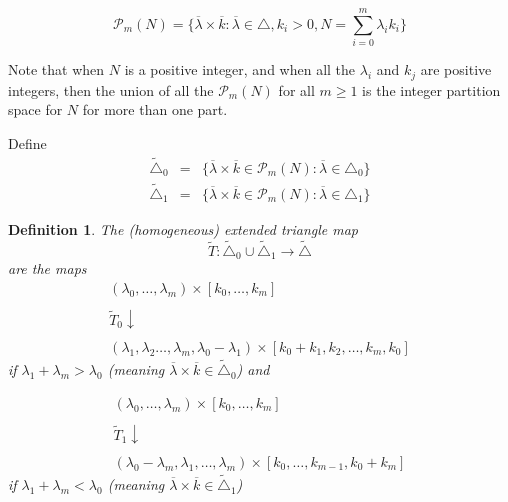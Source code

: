 \documentclass[12pt,oneside,openany]{article}
\newtheorem{definition}[theorem]{Definition}
\begin{document}
$$\mathcal{P}_m(N) = \{\overline{\lambda} \times \overline{k}: \overline{\lambda} \in \triangle, k_i>0, N = \sum_{i=0}^m \lambda_i k_i \} $$

Note that when $N$ is a positive integer, and when all the $\lambda_i$ and $k_j$ are positive integers, then the union of all the $\mathcal{P}_m(N)$ for all  $m\geq 1$  is the integer partition space for $N$ for more than one part.

Define
 \begin{eqnarray*}
 \tilde{\triangle}_0 &=& \{\overline{\lambda} \times \overline{k}\in \mathcal{P}_m(N) : \overline{\lambda} \in \triangle_0\} \\
  \tilde{\triangle}_1 &=& \{\overline{\lambda} \times \overline{k}\in \mathcal{P}_m(N) : \overline{\lambda} \in \triangle_1\} 
 \end{eqnarray*}




\begin{definition} The (homogeneous) extended triangle map 
$$\tilde{T}: \tilde{\triangle}_0 \cup \tilde{\triangle}_1 \rightarrow \tilde{\triangle}$$
are the maps
$$\begin{array}{c} (\lambda_0, \ldots , \lambda_m) \times [k_0,\ldots , k_m] \\ \\ \tilde{T}_0 \downarrow \\ \\ (\lambda_1, \lambda_2 \ldots , \lambda_m, \lambda_0-\lambda_1) \times [k_0+k_1,k_2, \ldots , k_m, k_0]  \end{array}$$
if $\lambda_1 + \lambda_m > \lambda_0$ (meaning $\overline{\lambda} \times \overline{k}\in \tilde{\triangle}_0$) and

$$\begin{array}{c} (\lambda_0, \ldots , \lambda_m) \times [k_0,\ldots , k_m] \\ \\ \tilde{T}_1 \downarrow \\ \\ (\lambda_0-\lambda_m, \lambda_1, \ldots , \lambda_m) \times [k_0, \ldots , k_{m-1}, k_0+ k_m]  \end{array}$$
if $\lambda_1 + \lambda_m < \lambda_0$ (meaning $\overline{\lambda} \times \overline{k}\in \tilde{\triangle}_1$) 

\end{definition}
\end{document}
